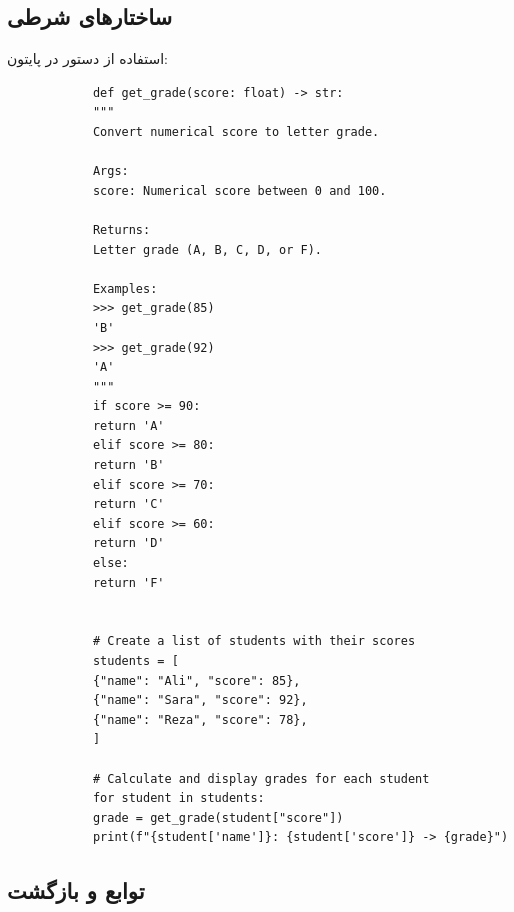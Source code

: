 \documentclass{matinbook}
\begin{document}
    \subsection{ساختارهای شرطی}
    
    استفاده از دستور  در پایتون:
    
    \begin{latin}
        \begin{verbatim}
            def get_grade(score: float) -> str:
            """
            Convert numerical score to letter grade.
            
            Args:
            score: Numerical score between 0 and 100.
            
            Returns:
            Letter grade (A, B, C, D, or F).
            
            Examples:
            >>> get_grade(85)
            'B'
            >>> get_grade(92)
            'A'
            """
            if score >= 90:
            return 'A'
            elif score >= 80:
            return 'B'
            elif score >= 70:
            return 'C'
            elif score >= 60:
            return 'D'
            else:
            return 'F'
            
            
            # Create a list of students with their scores
            students = [
            {"name": "Ali", "score": 85},
            {"name": "Sara", "score": 92},
            {"name": "Reza", "score": 78},
            ]
            
            # Calculate and display grades for each student
            for student in students:
            grade = get_grade(student["score"])
            print(f"{student['name']}: {student['score']} -> {grade}")
        \end{verbatim}
    \end{latin}
    \label{code:conditions}
    
    \subsection{توابع و بازگشت}
    
\end{document}
